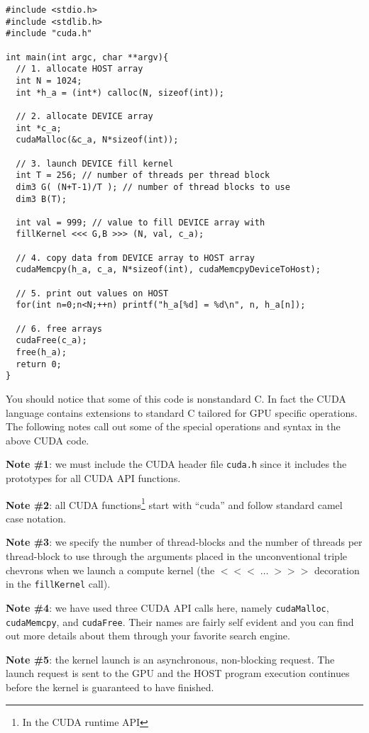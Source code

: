 \begin{verbatim}
#include <stdio.h>
#include <stdlib.h>
#include "cuda.h"

int main(int argc, char **argv){
  // 1. allocate HOST array     
  int N = 1024;
  int *h_a = (int*) calloc(N, sizeof(int));

  // 2. allocate DEVICE array
  int *c_a;
  cudaMalloc(&c_a, N*sizeof(int));

  // 3. launch DEVICE fill kernel   
  int T = 256; // number of threads per thread block
  dim3 G( (N+T-1)/T ); // number of thread blocks to use
  dim3 B(T);

  int val = 999; // value to fill DEVICE array with
  fillKernel <<< G,B >>> (N, val, c_a);

  // 4. copy data from DEVICE array to HOST array       
  cudaMemcpy(h_a, c_a, N*sizeof(int), cudaMemcpyDeviceToHost);

  // 5. print out values on HOST    
  for(int n=0;n<N;++n) printf("h_a[%d] = %d\n", n, h_a[n]);

  // 6. free arrays               
  cudaFree(c_a);
  free(h_a);
  return 0;
}
\end{verbatim}

You should notice that some of this code is nonstandard C. In fact the CUDA language contains extensions to standard C tailored for GPU specific operations. The following notes call out some of the special operations and syntax in the above CUDA code.

{\bf Note \#1}: we must include the CUDA header file \texttt{cuda.h} since it includes the prototypes for all CUDA API functions.

{\bf Note \#2}: all CUDA functions\footnote{In the CUDA runtime API} start with ``cuda'' and follow standard camel case notation.

{\bf Note \#3}: we specify the number of thread-blocks and the number of threads per thread-block to use through the arguments placed in the unconventional triple chevrons when we launch a compute kernel (the $<<<\;\ldots\;>>>$ decoration in the \texttt{fillKernel} call).

{\bf Note \#4}: we have used three CUDA API calls here, namely \texttt{cudaMalloc}, \texttt{cudaMemcpy}, and \texttt{cudaFree}. Their names are fairly self evident and you can find out more details about them through your favorite search engine.

{\bf Note \#5}: the kernel launch is an asynchronous, non-blocking request. The launch request is sent to the GPU and the HOST program execution continues before the kernel is guaranteed to have finished.

